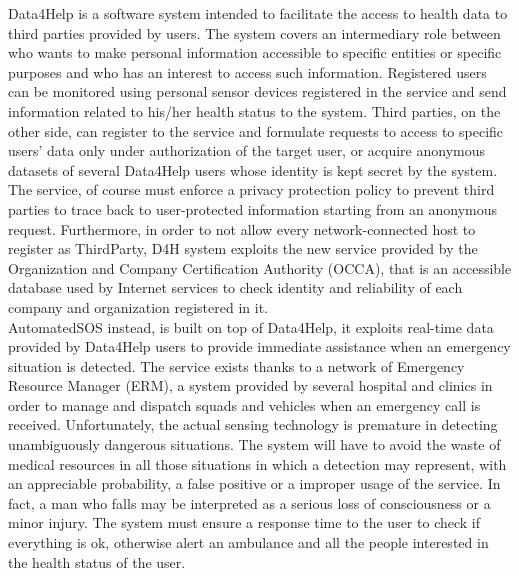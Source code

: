 \begin{flushleft}
Data4Help is a software system intended to facilitate the access to health data to third parties provided by users. The system covers an intermediary role between who wants to make personal information accessible to specific entities or specific purposes and who has an interest to access such information. Registered users can be monitored using personal sensor devices registered in the service and send information related to his/her health status to the system. Third parties, on the other side, can register to the service and formulate requests to access to specific users' data only under authorization of the target user, or acquire anonymous datasets of several Data4Help users whose identity is kept secret by the system. The service, of course must enforce a privacy protection policy to prevent third parties to trace back to user-protected information starting from an anonymous request. Furthermore, in order to not allow every network-connected host to register as ThirdParty, D4H system exploits the new service provided by the Organization and Company Certification Authority (OCCA), that is an accessible database used by Internet services to check identity and reliability of each company and organization registered in it.\\
AutomatedSOS instead, is built on top of Data4Help, it exploits real-time data provided by Data4Help users to provide immediate assistance when an emergency situation is detected. The service exists thanks to a network of Emergency Resource Manager (ERM), a system provided by several hospital and clinics in order to manage and dispatch squads and vehicles when an emergency call is received. Unfortunately, the actual sensing technology is premature in detecting unambiguously dangerous situations. The system will have to avoid the waste of medical resources in all those situations in which a detection may represent, with an appreciable probability, a false positive or a improper usage of the service. In fact, a man who falls may be interpreted as a serious loss of consciousness or a minor injury. The system must ensure a response time to the user to check if everything is ok, otherwise alert an ambulance and all the people interested in the health status of the user.
\paragraph{}


\end{flushleft}
